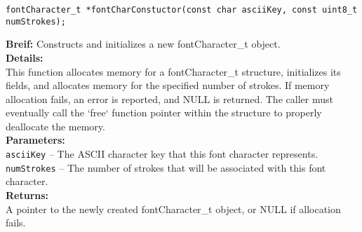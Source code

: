 
\begin{verbatim}
fontCharacter_t *fontCharConstuctor(const char asciiKey, const uint8_t numStrokes);
\end{verbatim}
\textbf{Breif:} Constructs and initializes a new fontCharacter\_t object. \\
\textbf{Details:} \\
\hspace*{1cm}This function allocates memory for a fontCharacter\_t structure, initializes its fields, and allocates memory for the specified number of strokes. If memory allocation fails, an error is reported, and NULL is returned. The caller must eventually call the `free` function pointer within the structure to properly deallocate the memory. \\
\textbf{Parameters:} \\
\hspace*{1cm}\texttt{asciiKey} -- The ASCII character key that this font character represents. \\
\hspace*{1cm}\texttt{numStrokes} -- The number of strokes that will be associated with this font character. \\
\textbf{Returns:} \\
\hspace*{1cm}A pointer to the newly created fontCharacter\_t object, or NULL if allocation fails. \\[1em]

